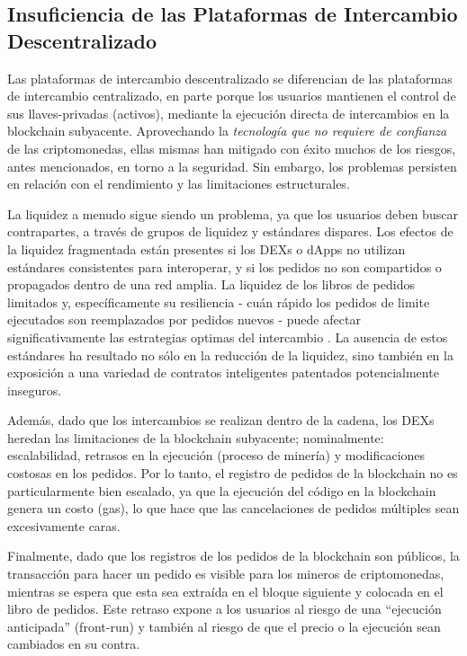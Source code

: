 \documentclass[UTF8,nofonts]{article}
\begin{document}
\begin{multicols}{2}
\subsection{Insuficiencia de las Plataformas de Intercambio Descentralizado}
Las plataformas de intercambio descentralizado se diferencian de las plataformas de intercambio centralizado, en parte porque los usuarios mantienen el control de sus llaves-privadas (activos), mediante la ejecuci\'on directa de intercambios en la blockchain subyacente. Aprovechando la \textit{tecnolog\'ia que no requiere de confianza} de las criptomonedas, ellas mismas han mitigado con \'exito muchos de los riesgos, antes mencionados, en torno a la seguridad. Sin embargo, los problemas persisten en relaci\'on con el rendimiento y las limitaciones estructurales.

La liquidez a menudo sigue siendo un problema, ya que los usuarios deben buscar contrapartes, a trav\'es de grupos de liquidez y est\'andares dispares. Los efectos de la liquidez fragmentada est\'an presentes si los DEXs o dApps no utilizan est\'andares consistentes para interoperar, y si los pedidos no son compartidos o propagados dentro de una red amplia. La liquidez de los libros de pedidos limitados y, espec\'ificamente su resiliencia - cu\'an r\'apido los pedidos de limite ejecutados son reemplazados por pedidos nuevos - puede afectar significativamente las estrategias optimas del intercambio \cite{limitorderliquidity}. La ausencia de estos est\'andares ha resultado no s\'olo en la reducci\'on de la liquidez, sino tambi\'en en la exposici\'on a una variedad de contratos inteligentes patentados potencialmente inseguros.


Adem\'as, dado que los intercambios se realizan dentro de la cadena, los DEXs heredan las limitaciones de la blockchain subyacente; nominalmente: escalabilidad, retrasos en la ejecuci\'on (proceso de miner\'ia) y modificaciones costosas en los pedidos. Por lo tanto, el registro de pedidos de la blockchain no es particularmente bien escalado, ya que la ejecuci\'on del c\'odigo en la blockchain genera un costo (gas), lo que hace que las cancelaciones de pedidos m\'ultiples sean excesivamente caras.

Finalmente, dado que los registros de los pedidos de la blockchain son p\'ublicos, la transacci\'on para hacer un pedido es visible para los mineros de criptomonedas, mientras se espera que esta sea extra\'ida en el bloque siguiente y colocada en el libro de pedidos. Este retraso expone a los usuarios al riesgo de una \enquote{ejecuci\'on anticipada} (front-run) y tambi\'en al riesgo de que el precio o la ejecuci\'on sean cambiados en su contra.


\end{multicols}
\end{document}
